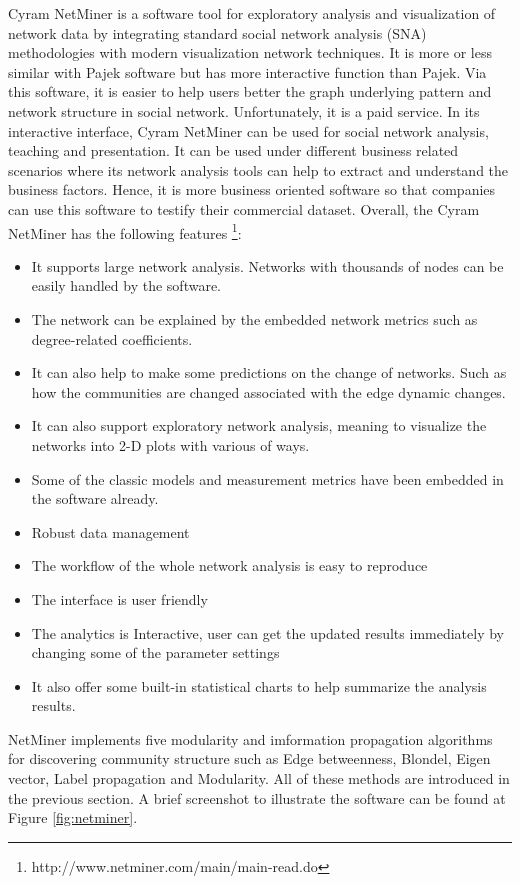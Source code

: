 Cyram NetMiner \cite{ghim2014netminer} is a software tool for exploratory analysis and visualization of network data by integrating
standard social network analysis (SNA) methodologies with
modern visualization network techniques. It is more or less similar with Pajek software but has more interactive function than Pajek. Via this software, it is easier to help users better the graph underlying pattern and network structure in social network. Unfortunately, it is a paid service. In its interactive interface, Cyram NetMiner  can be used for social network analysis, teaching and presentation. It can be used under different 
business related scenarios where its network analysis tools can help to extract and understand the business factors. Hence, it is more business oriented software so that companies can use this software to testify their commercial dataset. Overall, the Cyram NetMiner has the following features \footnote{http://www.netminer.com/main/main-read.do}:
\begin{itemize}
	\item It supports large network analysis. Networks with thousands of nodes can be easily handled by the software.
	\item The network can be explained by the embedded network metrics such as degree-related coefficients.
	\item It can also help to make some predictions on the change of networks. Such as how the communities are changed associated with the edge dynamic changes.
	\item It can also support exploratory network analysis, meaning to visualize the networks into 2-D plots with various of ways.
	\item Some of the classic models and measurement metrics have been embedded in the software already.  
	\item Robust data management
	\item The workflow of the whole network analysis is easy to reproduce
	\item The interface is user friendly
	\item The analytics is Interactive, user can get the updated results immediately by changing some of the parameter settings
	\item It also offer some built-in statistical  charts to help summarize the analysis results.
\end{itemize}

NetMiner implements five modularity and imformation propagation algorithms for discovering community structure such as Edge betweenness, Blondel, Eigen vector, Label propagation and Modularity. All of these methods are introduced in the previous section. A brief screenshot to illustrate the software can be found at Figure \ref{fig:netminer}.

